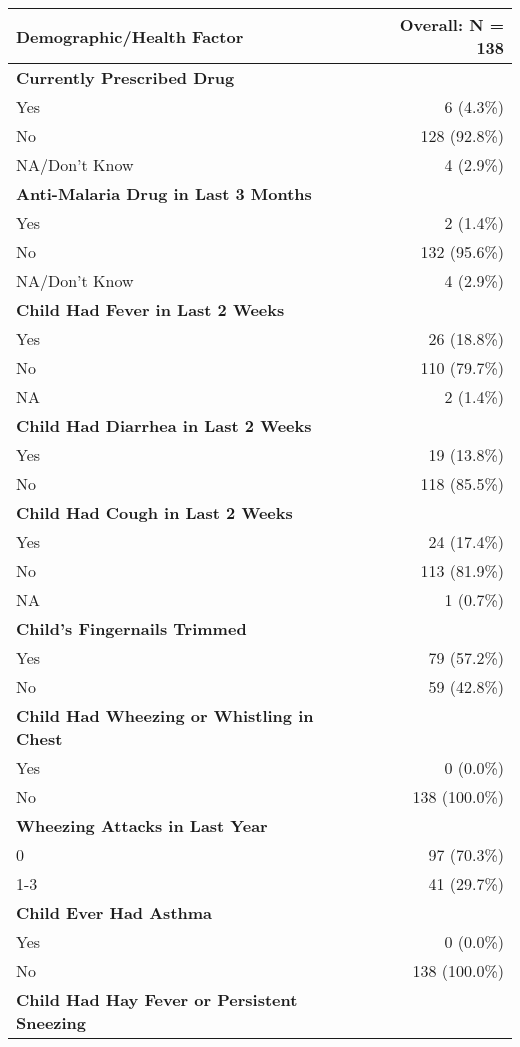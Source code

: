 \documentclass[4pt,letterpaper]{article}
\begin{document}
\begin{multicols}{2}
\begin{center}
\begin{tabular}{p{5cm}r}
\toprule
\textbf{Demographic/Health Factor} & \textbf{Overall: N = 138} \\
\midrule
\textbf{Currently Prescribed Drug} & \\
Yes & 6 (4.3\%) \\
No & 128 (92.8\%) \\
NA/Don't Know & 4 (2.9\%) \\
\midrule
\textbf{Anti-Malaria Drug in Last 3 Months} & \\
Yes & 2 (1.4\%) \\
No & 132 (95.6\%) \\
NA/Don't Know & 4 (2.9\%) \\
\midrule
\textbf{Child Had Fever in Last 2 Weeks} & \\
Yes & 26 (18.8\%) \\
No & 110 (79.7\%) \\
NA & 2 (1.4\%) \\
\midrule
\textbf{Child Had Diarrhea in Last 2 Weeks} & \\
Yes & 19 (13.8\%) \\
No & 118 (85.5\%) \\
\midrule
\textbf{Child Had Cough in Last 2 Weeks} & \\
Yes & 24 (17.4\%) \\
No & 113 (81.9\%) \\
NA & 1 (0.7\%) \\
\midrule
\textbf{Child's Fingernails Trimmed} & \\
Yes & 79 (57.2\%) \\
No & 59 (42.8\%) \\
\midrule
\textbf{Child Had Wheezing or Whistling in Chest} & \\
Yes & 0 (0.0\%) \\
No & 138 (100.0\%) \\
\midrule
\textbf{Wheezing Attacks in Last Year} & \\
0 & 97 (70.3\%) \\
1-3 & 41 (29.7\%) \\
\midrule
\textbf{Child Ever Had Asthma} & \\
Yes & 0 (0.0\%) \\
No & 138 (100.0\%) \\
\midrule
\textbf{Child Had Hay Fever or Persistent Sneezing} & \\

\end{tabular}
\end{center}
\end{multicols}
\end{document}

